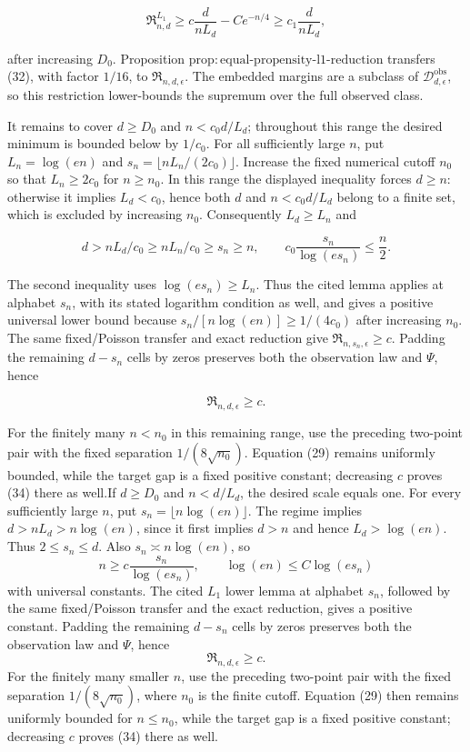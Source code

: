 \documentclass{article}
\begin{document}
\[
 \mathfrak R^{L_1}_{n,d}\geq c\frac d{nL_d}-Ce^{-n/4}
 \geq c_1\frac d{nL_d},                                              
\tag{32}
\]

after increasing \(D_0\).  Proposition \(\mathrm{prop:equal\mbox{-}propensity\mbox{-}l1\mbox{-}reduction}\) transfers (32), with factor \(1/16\), to \(\mathfrak R_{n,d,\epsilon}\).  The embedded margins are a subclass of \(\mathcal D_{d,\epsilon}^{\mathrm{obs}}\), so this restriction lower-bounds the supremum over the full observed class.

It remains to cover \(d\geq D_0\) and \(n<c_0d/L_d\); throughout this range the desired minimum is bounded below by \(1/c_0\).  For all sufficiently large \(n\), put \(L_n=\log(en)\) and \(s_n=\lfloor nL_n/(2c_0)\rfloor\).  Increase the fixed numerical cutoff \(n_0\) so that \(L_n\geq2c_0\) for \(n\geq n_0\).  In this range the displayed inequality forces \(d\geq n\): otherwise it implies \(L_d<c_0\), hence both \(d\) and \(n<c_0d/L_d\) belong to a finite set, which is excluded by increasing \(n_0\).  Consequently \(L_d\geq L_n\) and

\[
 d>nL_d/c_0\geq nL_n/c_0\geq s_n\geq n,
 \qquad c_0\frac{s_n}{\log(es_n)}\leq\frac n2.                    
\tag{33}
\]

The second inequality uses \(\log(es_n)\geq L_n\).  Thus the cited lemma applies at alphabet \(s_n\), with its stated logarithm condition as well, and gives a positive universal lower bound because \(s_n/[n\log(en)]\geq1/(4c_0)\) after increasing \(n_0\).  The same fixed/Poisson transfer and exact reduction give \(\mathfrak R_{n,s_n,\epsilon}\geq c\).  Padding the remaining \(d-s_n\) cells by zeros preserves both the observation law and \(\Psi\), hence

\[
 \mathfrak R_{n,d,\epsilon}\geq c.                                 
\tag{34}
\]

For the finitely many \(n<n_0\) in this remaining range, use the preceding two-point pair with the fixed separation \(1/(8\sqrt{n_0})\).  Equation (29) remains uniformly bounded, while the target gap is a fixed positive constant; decreasing \(c\) proves (34) there as well.If \(d\geq D_0\) and \(n<d/L_d\), the desired scale equals one.  For every sufficiently large \(n\), put \(s_n=\lfloor n\log(en)\rfloor\).  The regime implies \(d>nL_d>n\log(en)\), since it first implies \(d>n\) and hence \(L_d>\log(en)\).  Thus \(2\leq s_n\leq d\).  Also \(s_n\asymp n\log(en)\), so
\[
 n\geq c\frac{s_n}{\log(es_n)},\qquad \log(en)\leq C\log(es_n)   \tag{33}
\]
with universal constants.  The cited \(L_1\) lower lemma at alphabet \(s_n\), followed by the same fixed/Poisson transfer and the exact reduction, gives a positive constant.  Padding the remaining \(d-s_n\) cells by zeros preserves both the observation law and \(\Psi\), hence
\[
 \mathfrak R_{n,d,\epsilon}\geq c.                                 \tag{34}
\]
For the finitely many smaller \(n\), use the preceding two-point pair with the fixed separation \(1/(8\sqrt{n_0})\), where \(n_0\) is the finite cutoff.  Equation (29) then remains uniformly bounded for \(n\leq n_0\), while the target gap is a fixed positive constant; decreasing \(c\) proves (34) there as well.
\end{document}
